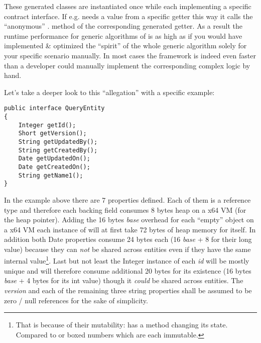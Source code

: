 
These generated classes are instantiated once while each implementing a specific contract interface. If \AMBETH{} e.g. needs a value from a specific getter this way it calls the ``anonymous'' . method of the corresponding generated getter. As a result the runtime performance for generic algorithms of \AMBETH{} is as high as if you would have implemented \& optimized the ``spirit'' of the whole generic algorithm solely for your specific scenario manually. In most cases the framework is indeed even faster than a developer could manually implement the corresponding complex logic by hand.

Let's take a deeper look to this ``allegation'' with a specific example:
\begin{lstlisting}[style=Java,caption={Example entity definition (Java)}]
public interface QueryEntity
{
	Integer getId();
	Short getVersion();
	String getUpdatedBy();
	String getCreatedBy();
	Date getUpdatedOn();
	Date getCreatedOn();
	String getName1();
}
\end{lstlisting}

In the example above there are 7 properties defined. Each of them is a reference type and therefore each backing field consumes 8 bytes heap on a x64 VM (for the heap pointer). Adding the 16 bytes \textit{base} overhead for each ``empty'' object on a x64 VM each instance of  will at first take 72 bytes of heap memory for itself. In addition both Date properties consume 24 bytes each (16 \textit{base} + 8 for their long value) because they can \emph{not} be shared across entities even if they have the same internal value\footnote{That is because of their mutability:  has a method  changing its state. Compared to  or boxed numbers which are each immutable.}. Last but not least the Integer instance of each \emph{id} will be mostly unique and will therefore consume additional 20 bytes for its existence (16 bytes \textit{base} + 4 bytes for its int value) though it \emph{could} be shared across entities. The \emph{version} and each of the remaining three string properties shall be assumed to be zero / null references for the sake of simplicity.\newline

